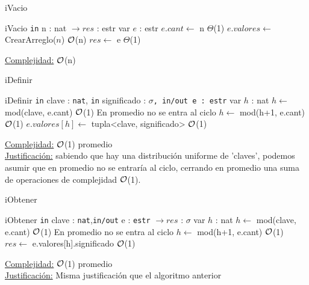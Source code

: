 \begin{Algoritmos}
	
	\begin{algorithm}
		\caption{iVacio}
		\begin{algorithmic}
			\Procedure
			{iVacio}
			{\texttt{in} n : nat} $\to res$ : estr
				\State var $e$ : estr
				\State $e.cant \gets$ n \Comment $\Theta$(1)
				\State $e.valores \gets$ CrearArreglo($n$) \Comment $\mathcal{O}$(n)
				\State $res \gets$ e \Comment $\Theta$(1)
			\EndProcedure
		\end{algorithmic}
		\underline{Complejidad:} $\mathcal{O}$(n)
	\end{algorithm}
	
	\begin{algorithm}
		\caption{iDefinir}
		\begin{algorithmic}
			\Procedure
			{iDefinir}
			{\texttt{in} clave : \texttt{nat}, \texttt{in} significado : \texttt{$\sigma$, \texttt{in/out} e : \texttt{estr}}}
				\State var $h$ : nat
				\State $h \gets$ mod(clave, e.cant) \Comment $\mathcal{O}$(1)
				 \Comment En promedio no se entra al ciclo
						\State $h \gets$ mod(h+1, e.cant) \Comment $\mathcal{O}$(1)
				\EndWhile
				\State $e.valores[h] \gets$ tupla<clave, significado> \Comment $\mathcal{O}$(1)
			\EndProcedure
		\end{algorithmic}
		\underline{Complejidad:} $\mathcal{O}$(1) promedio
		\\
		\underline{Justificación:} sabiendo que hay una distribución uniforme de 'claves', podemos asumir que en promedio no se entraría al ciclo, cerrando en promedio una suma de operaciones de complejidad $\mathcal{O}$(1).
	\end{algorithm}
	
	\begin{algorithm}
		\caption{iObtener}
		\begin{algorithmic}
			\Procedure
			{iObtener}
			{\texttt{in} clave : \texttt{nat},\texttt{in/out} e : \texttt{estr}} $\to res$ : $\sigma$
				\State var $h$ : nat				
				\State $h \gets$ mod(clave, e.cant) \Comment $\mathcal{O}$(1)
				\While{e.valores[h].clave $\neq$ clave} 
				\Comment En promedio no se entra al ciclo
					\State $h \gets$  mod(h+1, e.cant) \Comment $\mathcal{O}$(1)
				\EndWhile
				\State $res \gets$ e.valores[h].significado \Comment $\mathcal{O}$(1)
			\EndProcedure
		\end{algorithmic}
		\underline{Complejidad:} $\mathcal{O}$(1) promedio \\
		\underline{Justificación:} Misma justificación que el algoritmo anterior
	\end{algorithm}
	
\end{Algoritmos}